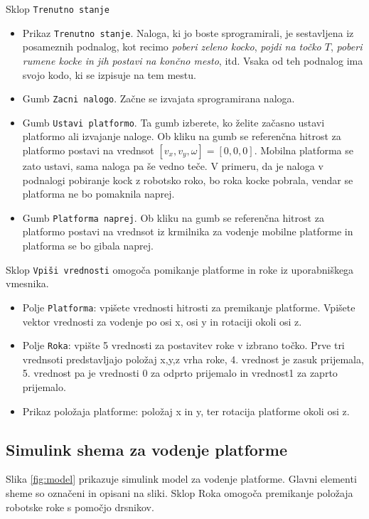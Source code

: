 Sklop \verb"Trenutno stanje"
\begin{itemize}
\item Prikaz \verb"Trenutno stanje". Naloga, ki jo boste sprogramirali, je sestavljena iz posameznih podnalog, kot recimo \textit{poberi zeleno kocko}, \textit{pojdi na točko $T$}, \textit{poberi rumene kocke in jih postavi na končno mesto}, itd. Vsaka od teh podnalog ima svojo kodo, ki se izpisuje na tem mestu.
\item Gumb \verb"Zacni nalogo". Začne se izvajata sprogramirana naloga.
\item Gumb \verb"Ustavi platformo". Ta gumb izberete, ko želite začasno ustavi platformo ali izvajanje naloge. Ob kliku na gumb se referenčna hitrost za platformo postavi na vrednsot $[v_x,v_y,\omega]=[0,0,0]$. Mobilna platforma se zato ustavi, sama naloga pa še vedno teče. V primeru, da je naloga v podnalogi pobiranje kock z robotsko roko, bo roka kocke pobrala, vendar se platforma ne bo pomaknila naprej.
\item Gumb \verb"Platforma naprej". Ob kliku na gumb se referenčna hitrost za platformo postavi na vrednsot iz krmilnika za vodenje mobilne platforme in platforma se bo gibala naprej.
\end{itemize}

Sklop \verb"Vpiši vrednosti" omogoča pomikanje platforme in roke iz uporabniškega vmesnika. 

\begin{itemize}
	\item Polje \verb|Platforma|: vpišete vrednosti hitrosti za premikanje platforme. Vpišete vektor vrednosti za vodenje po osi x, osi y in rotaciji okoli osi z.
	\item Polje \verb|Roka|: vpište 5 vrednosti za postavitev roke v izbrano točko. Prve tri vrednsoti predstavljajo položaj x,y,z vrha roke, 4. vrednost je zasuk prijemala, 5. vrednost pa je vrednosti 0 za odprto prijemalo in vrednost1 za zaprto prijemalo.
	\item Prikaz položaja platforme: položaj x in y, ter rotacija platforme okoli osi z.
\end{itemize}


\newpage

\subsection{Simulink shema za vodenje platforme}

Slika \ref{fig:model} prikazuje simulink model za vodenje platforme. Glavni elementi sheme so označeni in opisani na sliki. Sklop Roka omogoča premikanje položaja robotske roke s pomočjo drsnikov.


